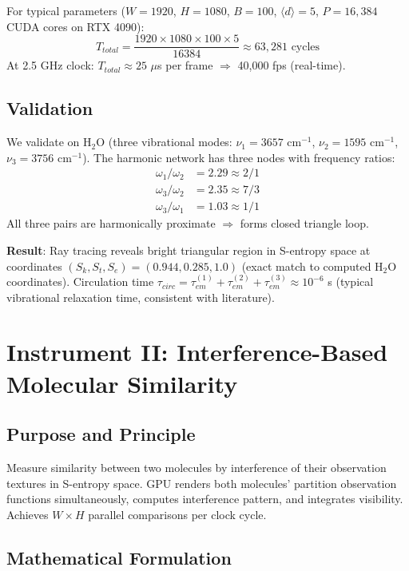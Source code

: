 \documentclass[11pt,a4paper]{article}
\theoremstyle{definition}
\theoremstyle{remark}
\begin{document}
For typical parameters ($W=1920$, $H=1080$, $B=100$, $\langle d \rangle = 5$, $P=16{,}384$ CUDA cores on RTX 4090):
\begin{equation}
T_{total} = \frac{1920 \times 1080 \times 100 \times 5}{16384} \approx 63{,}281 \text{ cycles}
\end{equation}
At 2.5 GHz clock: $T_{total} \approx 25$ $\mu$s per frame $\Rightarrow$ 40,000 fps (real-time).

\subsection{Validation}

We validate on H$_2$O (three vibrational modes: $\nu_1 = 3657$ cm$^{-1}$, $\nu_2 = 1595$ cm$^{-1}$, $\nu_3 = 3756$ cm$^{-1}$). The harmonic network has three nodes with frequency ratios:
\begin{align}
\omega_1/\omega_2 &= 2.29 \approx 2/1 \\
\omega_3/\omega_2 &= 2.35 \approx 7/3 \\
\omega_3/\omega_1 &= 1.03 \approx 1/1
\end{align}
All three pairs are harmonically proximate $\Rightarrow$ forms closed triangle loop.

\textbf{Result}: Ray tracing reveals bright triangular region in S-entropy space at coordinates $(S_k, S_t, S_e) = (0.944, 0.285, 1.0)$ (exact match to computed H$_2$O coordinates). Circulation time $\tau_{circ} = \tau_{em}^{(1)} + \tau_{em}^{(2)} + \tau_{em}^{(3)} \approx 10^{-6}$ s (typical vibrational relaxation time, consistent with literature).

\section{Instrument II: Interference-Based Molecular Similarity}
\label{sec:instrument2}

\subsection{Purpose and Principle}

Measure similarity between two molecules by interference of their observation textures in S-entropy space. GPU renders both molecules' partition observation functions simultaneously, computes interference pattern, and integrates visibility. Achieves $W \times H$ parallel comparisons per clock cycle.

\subsection{Mathematical Formulation}
\end{document}
